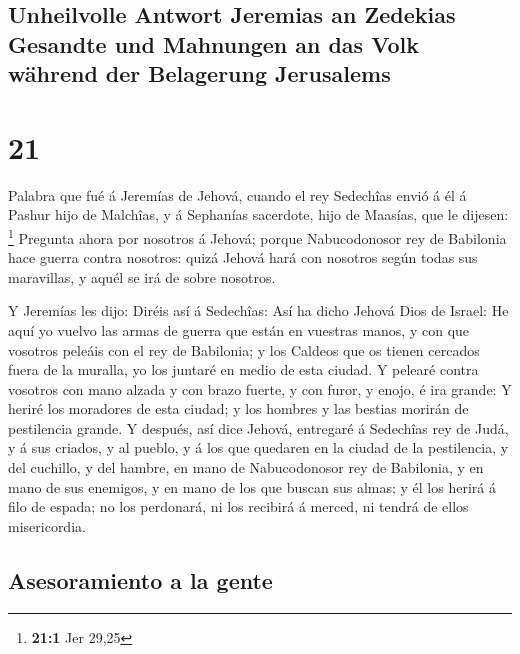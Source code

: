 \hypertarget{unheilvolle-antwort-jeremias-an-zedekias-gesandte-und-mahnungen-an-das-volk-wuxe4hrend-der-belagerung-jerusalems}{%
\subsection{Unheilvolle Antwort Jeremias an Zedekias Gesandte und
Mahnungen an das Volk während der Belagerung
Jerusalems}\label{unheilvolle-antwort-jeremias-an-zedekias-gesandte-und-mahnungen-an-das-volk-wuxe4hrend-der-belagerung-jerusalems}}

\hypertarget{section-20}{%
\section{21}\label{section-20}}

 Palabra que fué á Jeremías de Jehová, cuando el rey
Sedechîas envió á él á Pashur hijo de Malchîas, y á Sephanías sacerdote,
hijo de Maasías, que le dijesen: \footnote{\textbf{21:1} Jer 29,25}
 Pregunta ahora por nosotros á Jehová; porque
Nabucodonosor rey de Babilonia hace guerra contra nosotros: quizá Jehová
hará con nosotros según todas sus maravillas, y aquél se irá de sobre
nosotros.

 Y Jeremías les dijo: Diréis así á Sedechîas:
 Así ha dicho Jehová Dios de Israel: He aquí yo vuelvo las
armas de guerra que están en vuestras manos, y con que vosotros peleáis
con el rey de Babilonia; y los Caldeos que os tienen cercados fuera de
la muralla, yo los juntaré en medio de esta ciudad.  Y
pelearé contra vosotros con mano alzada y con brazo fuerte, y con furor,
y enojo, é ira grande:  Y heriré los moradores de esta
ciudad; y los hombres y las bestias morirán de pestilencia grande.
 Y después, así dice Jehová, entregaré á Sedechîas rey de
Judá, y á sus criados, y al pueblo, y á los que quedaren en la ciudad de
la pestilencia, y del cuchillo, y del hambre, en mano de Nabucodonosor
rey de Babilonia, y en mano de sus enemigos, y en mano de los que buscan
sus almas; y él los herirá á filo de espada; no los perdonará, ni los
recibirá á merced, ni tendrá de ellos misericordia.

\hypertarget{asesoramiento-a-la-gente}{%
\subsection{Asesoramiento a la gente}\label{asesoramiento-a-la-gente}}

